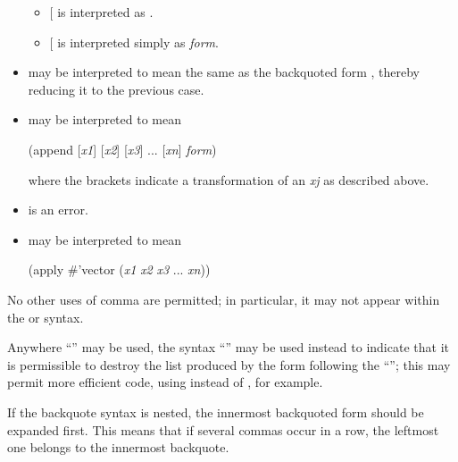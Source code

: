 \begin{flushdesc}
\begin{itemize}
\begin{itemize}
\item
{\rm [}\cd{,{\it form}}{\rm ]} is interpreted as .

\item
{\rm [}\cd{,{\Xatsign}{\it form}}{\rm ]} is interpreted simply as {\it form}.
\end{itemize}

\item
{} may be interpreted to mean
the same as the backquoted form
,
thereby reducing it to the previous case.

\item
{} may be interpreted to mean
\begin{lisp}
(append {\rm [}{\it x1}{\rm ]} {\rm [}{\it x2}{\rm ]}
    {\rm [}{\it x3}{\rm ]} ... {\rm [}{\it xn}{\rm ]} {\it form})
\end{lisp}
where the brackets indicate a transformation of an {\it xj} as described above.

\item
{} is an error.

\item
{} may be interpreted to mean
\begin{lisp}
(apply \#'vector {\Xbq}({\it x1} {\it x2} {\it x3} ... {\it xn}))
\end{lisp}
\end{itemize}

No other uses of comma are permitted; in particular, it may not appear within
the  or  syntax.

Anywhere ``\cd{,{\Xatsign}}'' may be used, the syntax ``'' may be used instead
to indicate that it is permissible to destroy the list produced by the form
following the ``''; this may permit more efficient code, using
 instead of , for example.

If the backquote syntax is nested, the innermost backquoted form
should be expanded first.  This means that if several commas occur
in a row, the leftmost one belongs to the innermost backquote.


\end{flushdesc}
